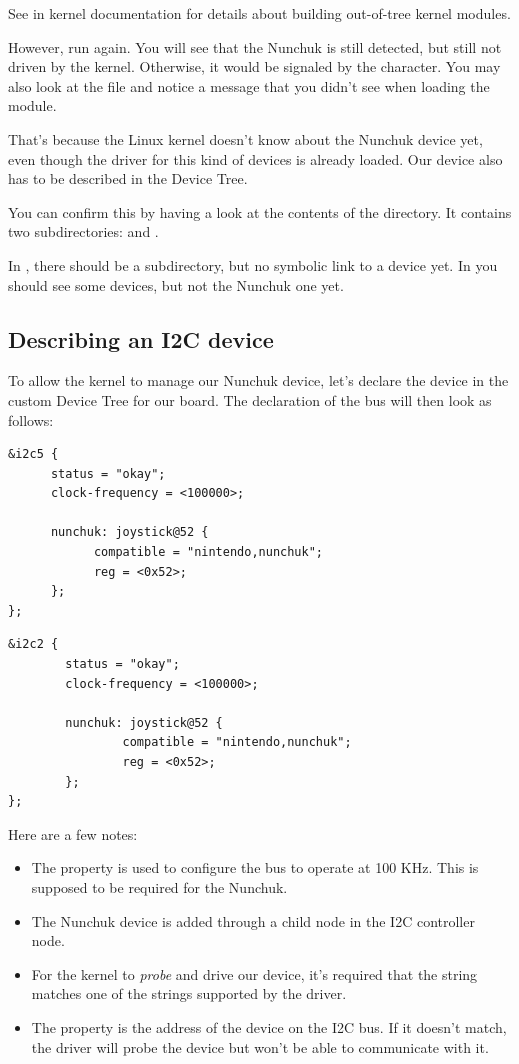 See  in kernel documentation
for details about building out-of-tree kernel modules.

However, run  again. You will see that the
Nunchuk is still detected, but still not driven by the kernel.
Otherwise, it would be signaled by the  character. You
may also look at the  file and notice a
 message that you didn't
see when loading the module.

That's because the Linux kernel doesn't know about the Nunchuk
device yet, even though the driver for this kind of devices is
already loaded. Our device also has to be described in the Device Tree.

You can confirm this by having a look at the contents of the
 directory.  It contains two subdirectories:
 and .

In , there should be a  subdirectory,
but no symbolic link to a device yet. In  you should
see some devices, but not the Nunchuk one yet.

\subsection{Describing an I2C device}

To allow the kernel to manage our Nunchuk device, let's declare the
device in the custom Device Tree for our board. The declaration of the
\busname bus will then look as follows:

\if{}
\begin{verbatim}
&i2c5 {
      status = "okay";
      clock-frequency = <100000>;

      nunchuk: joystick@52 {
            compatible = "nintendo,nunchuk";
            reg = <0x52>;
      };
};
\end{verbatim}
\fi
\if{}
\begin{verbatim}
&i2c2 {
        status = "okay";
        clock-frequency = <100000>;

        nunchuk: joystick@52 {
                compatible = "nintendo,nunchuk";
                reg = <0x52>;
        };
};
\end{verbatim}
\fi

Here are a few notes:
\begin{itemize}
\item The  property is used to configure the bus
      to operate at 100 KHz. This is supposed to be required for the
      Nunchuk.
\item The Nunchuk device is added through a child node in the I2C
      controller node.
\item For the kernel to {\em probe} and drive our device, it's required
      that the  string matches one of the
       strings supported by the driver.
\item The  property is the address of the device on the
      I2C bus. If it doesn't match, the driver will probe the device
      but won't be able to communicate with it.
\end{itemize}


